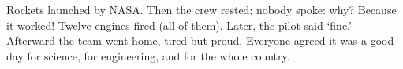 \documentclass{article}
\begin{document}
Rockets launched by NASA. Then the crew rested; nobody spoke: why? Because
it worked! Twelve engines fired (all of them). Later, the pilot said `fine.'
Afterward the team went home, tired but proud. Everyone agreed it was a good
day for science, for engineering, and for the whole country.
\end{document}
